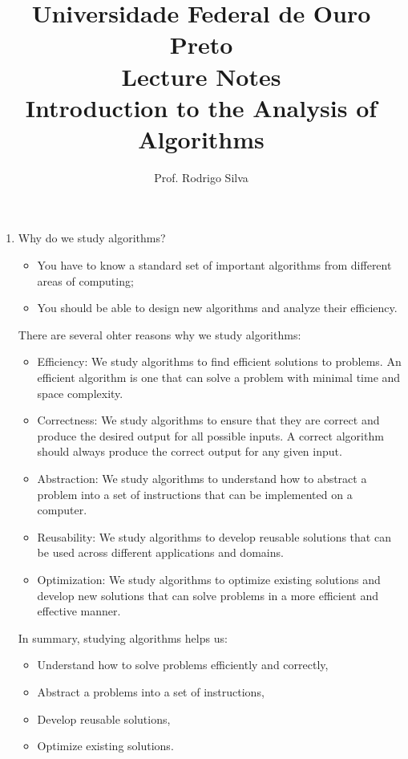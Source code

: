 \documentclass{article}
\title{\vspace{-2 cm}Universidade Federal de Ouro Preto \\ Lecture Notes \\ Introduction to the Analysis of Algorithms}
\author{Prof. Rodrigo Silva}
\begin{document}
\maketitle

\begin{enumerate}
    \item Why do we study algorithms?
    
    \begin{itemize}
        \item You have to know a standard set of important algorithms from different areas of computing; 
        \item You should be able to design new algorithms and analyze their efficiency.
    \end{itemize}

    There are several ohter reasons why we study algorithms:
    
    \begin{itemize}

        \item Efficiency: We study algorithms to find efficient solutions to problems. An efficient algorithm is one that can solve a problem with minimal time and space complexity.
    
        \item Correctness: We study algorithms to ensure that they are correct and produce the desired output for all possible inputs. A correct algorithm should always produce the correct output for any given input.
    
        \item Abstraction: We study algorithms to understand how to abstract a problem into a set of instructions that can be implemented on a computer.
    
        \item Reusability: We study algorithms to develop reusable solutions that can be used across different applications and domains.
    
        \item Optimization: We study algorithms to optimize existing solutions and develop new solutions that can solve problems in a more efficient and effective manner.
    
    \end{itemize}
        

    In summary, studying algorithms helps us: 
    \begin{itemize}
        \item Understand how to solve problems efficiently and correctly, 
        \item Abstract a problems into a set of instructions, 
        \item Develop reusable solutions, 
        \item Optimize existing solutions.
    \end{itemize}


\end{enumerate}
\end{document}

